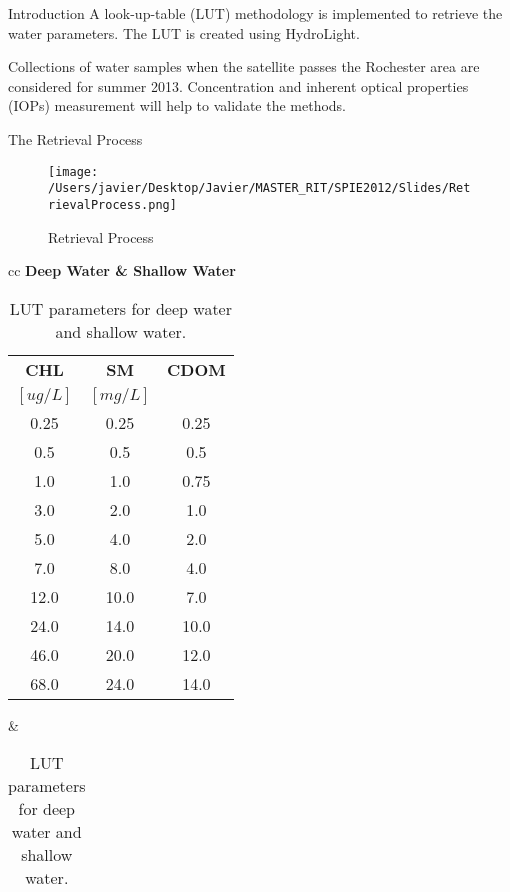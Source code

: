 \documentclass[mathserif]{beamer}
\begin{document}
\begin{frame}{}
\begin{columns}[t]
\begin{column}{.3\linewidth}
\begin{block}{Introduction}
A look-up-table (LUT) methodology is implemented to retrieve the water parameters. The LUT is created using HydroLight.

Collections of water samples when the satellite passes the Rochester area are considered for summer 2013. Concentration and inherent optical properties (IOPs) measurement  will help to validate the methods. 
\vspace{1cm}
\end{block}

\begin{block}{The Retrieval Process}   
\begin{center}
\begin{figure}
	\texttt{[image: /Users/javier/Desktop/Javier/MASTER\_RIT/SPIE2012/Slides/RetrievalProcess.png]}
	\caption{Retrieval Process \label{fig:RetProc}}
\end{figure}
\end{center}
\vspace{1cm}
\begin{center}
\begin{table}
	\caption{LUT parameters for deep water and shallow water. \label{tab:LUTs}}
      	\begin{tabular}{cc}
        	\bfseries{Deep Water} & \bfseries{Shallow Water}\\ 
		\footnotesize
		\begin{tabular}{c|c|c}
        		\bfseries{CHL}  	& \bfseries{SM}  & \bfseries{CDOM} \\ 
		$[ug/L]$  		& $[mg/L]$ & 			\\ \hline \hline
			0.25			& 0.25 	& 	0.25		\\
			0.5			& 0.5		&	0.5		\\
			1.0			& 1.0		&	0.75		\\
			3.0			& 2.0		&	1.0		\\
			5.0			& 4.0		&	2.0		\\
			7.0			& 8.0		&	4.0		\\
			12.0			& 10.0	&	7.0		\\
			24.0			& 14.0	&	10.0		\\
			46.0			& 20.0	&	12.0		\\
			68.0			& 24.0	&	14.0 		\\    
	 	\end{tabular}	&
		\footnotesize
		\begin{tabular}{c|l|l|l|l}

\end{tabular}
\end{tabular}
\end{table}
\end{center}
\end{block}
\end{column}
\end{columns}
\end{frame}
\end{document}
